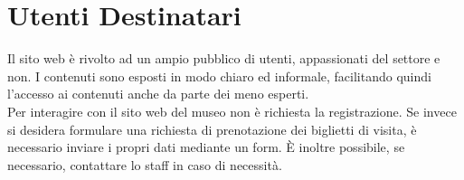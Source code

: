 \section{Utenti Destinatari}
Il sito web è rivolto ad un ampio pubblico di utenti, appassionati del settore e non. I contenuti sono esposti in modo chiaro ed informale, facilitando quindi l'accesso ai contenuti anche da parte dei meno esperti.\\
Per interagire con il sito web del museo non è richiesta la registrazione. Se invece si desidera formulare una richiesta di prenotazione dei biglietti di visita, è necessario inviare i propri dati mediante un form. È inoltre possibile, se necessario, contattare lo staff in caso di necessità.
